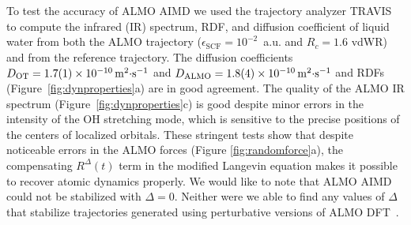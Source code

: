 \documentclass[aip,jcp,reprint,amsmath,amssymb]{revtex4-1}
\begin{document}


To test the accuracy of ALMO AIMD we used the trajectory analyzer TRAVIS~\cite{a:travis-main} to compute the infrared (IR) spectrum, RDF, and diffusion coefficient of liquid water from both the ALMO trajectory ($\epsilon_{\text{SCF}} = 10^{-2}$~a.u. and $R_{c} = 1.6$ vdWR) and from the reference trajectory. 
The diffusion coefficients $D_{\text{OT}}=\SI{1.7\pm0.1E-10}{\m^{2}\cdot\s^{-1}}$ and $D_{\text{ALMO}}=\SI{1.8\pm0.4E-10}{\m^{2}\cdot\s^{-1}}$ and RDFs (Figure~\ref{fig:dynproperties}a) are in good agreement. The quality of the ALMO IR spectrum (Figure~\ref{fig:dynproperties}c) is good despite minor errors in the intensity of the OH stretching mode, which is sensitive to the precise positions of the centers of localized orbitals. These stringent tests show that despite noticeable errors in the ALMO forces (Figure \ref{fig:randomforce}a), the compensating $R^{\Delta}(t)$ term in the modified Langevin equation makes it possible to recover atomic dynamics properly. We would like to note that ALMO AIMD could not be stabilized with $\Delta=0$. Neither were we able to find any values of $\Delta$ that stabilize trajectories generated using perturbative versions of ALMO DFT~\cite{a:almo-ls}.


\end{document}
